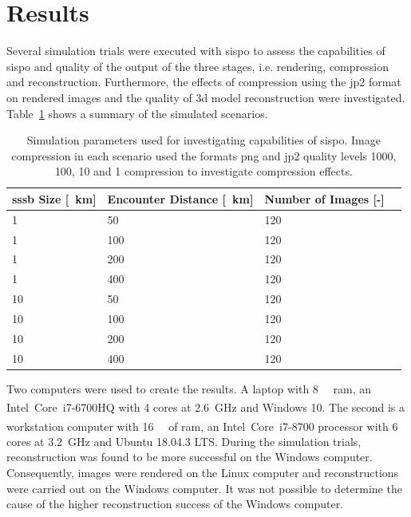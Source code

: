 \section{Results} \label{sec:results}
Several simulation trials were executed with \gls{sispo} to assess the capabilities of \gls{sispo} and quality of the output of the three stages, i.e. rendering, compression and reconstruction. Furthermore, the effects of compression using the \gls{jp2} format on rendered images and the quality of \gls{3d} model reconstruction were investigated. Table~\ref{tab:sim_params} shows a summary of the simulated scenarios.

\begin{table}[htb]
    \centering
    \caption{Simulation parameters used for investigating capabilities of \gls{sispo}. Image compression in each scenario used the formats \gls{png} and \gls{jp2} quality levels 1000, 100, 10 and 1 compression to investigate compression effects.}
    \label{tab:sim_params}
    \begin{tabular}{l|lll}
        \textbf{\gls{sssb} Size [\SI{}{\kilo\meter}]}& \textbf{Encounter Distance [\SI{}{\kilo\meter}]} & \textbf{Number of Images [-]} \\ \hline
        1  & 50  & 120\\
        1  & 100 & 120\\
        1  & 200 & 120\\
        1  & 400 & 120\\
        10 & 50  & 120\\
        10 & 100 & 120\\
        10 & 200 & 120\\
        10 & 400 & 120\\
    \end{tabular}
\end{table}

Two computers were used to create the results. A laptop with \SI{8}{\giga\byte} \gls{ram}, an Intel\textsuperscript{\textregistered}~Core\texttrademark~i7-6700HQ with \SI{4}{} cores at \SI{2.6}{\giga\hertz} and Windows 10. The second is a workstation computer with \SI{16}{\giga\byte} of \gls{ram}, an Intel\textsuperscript{\textregistered}~Core\texttrademark~i7-8700 processor with \SI{6}{} cores at \SI{3.2}{\giga\hertz} and Ubuntu 18.04.3 LTS. During the simulation trials, reconstruction was found to be more successful on the Windows computer. Consequently, images were rendered on the Linux computer and reconstructions were carried out on the Windows computer. It was not possible to determine the cause of the higher reconstruction success of the Windows computer.

